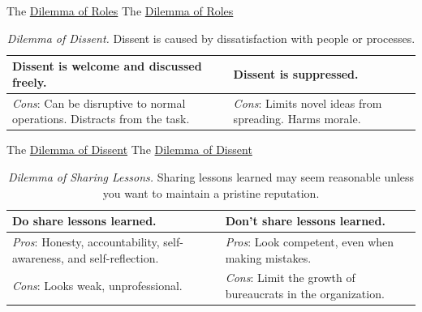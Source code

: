 The \href{table:number-of-roles}{Dilemma of Roles}
The \href{table:number-of-roles}{Dilemma of Roles}


\begin{center}
\begin{table}[H] %
\begin{tabular}{ | m{\dilemmatablewidth}| m{\dilemmatablewidth} | } 
  \hline
  \textbf{Dissent is welcome and discussed freely.} & 
  \textbf{Dissent is suppressed.} \\ 
  \hline
  \textit{Cons}: Can be disruptive to normal operations. Distracts from the task. & 
  \textit{Cons}: Limits novel ideas from spreading. Harms morale. \\  
  \hline
\end{tabular}
\caption{
\textit{Dilemma of Dissent.}
Dissent is caused by dissatisfaction with people or processes. 
}
\label{table:how-dissent-is-responded-to}
\end{table}
\end{center}


The \href{table:how-dissent-is-responded-to}{Dilemma of Dissent}
The \href{table:how-dissent-is-responded-to}{Dilemma of Dissent}


\begin{center}
\begin{table}[H] %
\begin{tabular}{ | m{\dilemmatablewidth}| m{\dilemmatablewidth} | } 
  \hline
  \textbf{Do share lessons learned.} & 
  \textbf{Don't share lessons learned.} \\ 
  \hline
  \textit{Pros}: Honesty, accountability, self-awareness, and self-reflection. & 
  \textit{Pros}: Look competent, even when making mistakes. \\  
  \hline
  \textit{Cons}: Looks weak, unprofessional. & 
  \textit{Cons}: Limit the growth of bureaucrats in the organization. \\  
  \hline
\end{tabular}
\caption{
\textit{Dilemma of Sharing Lessons.}
Sharing lessons learned may seem reasonable unless you want to maintain a pristine reputation. 
}
\label{table:sharing-lessons-learned}
\end{table}
\end{center}


